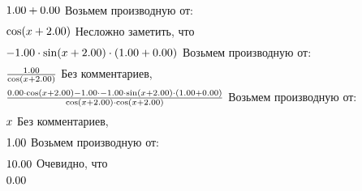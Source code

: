 \begin{gather}
\end{gather}
\begin{math}
1.00 + 0.00 \\
\end{math}
Возьмем производную от:
\begin{gather}
\end{gather}
\begin{math}
\cos (x + 2.00 )\\
\end{math}
Несложно заметить, что
\begin{gather}
\end{gather}
\begin{math}
-1.00 \cdot \sin (x + 2.00 )\cdot (1.00 + 0.00 )\\
\end{math}
Возьмем производную от:
\begin{gather}
\end{gather}
\begin{math}
\frac {1.00 }{\cos (x + 2.00 )}\\
\end{math}
Без комментариев, 
\begin{gather}
\end{gather}
\begin{math}
\frac {0.00 \cdot \cos (x + 2.00 )- 1.00 \cdot -1.00 \cdot \sin (x + 2.00 )\cdot (1.00 + 0.00 )}{\cos (x + 2.00 )\cdot \cos (x + 2.00 )}\\
\end{math}
Возьмем производную от:
\begin{gather}
\end{gather}
\begin{math}
x \\
\end{math}
Без комментариев, 
\begin{gather}
\end{gather}
\begin{math}
1.00 \\
\end{math}
Возьмем производную от:
\begin{gather}
\end{gather}
\begin{math}
10.00 \\
\end{math}
Очевидно, что
\begin{gather}
\end{gather}
\begin{math}
0.00 \\
\end{math}
